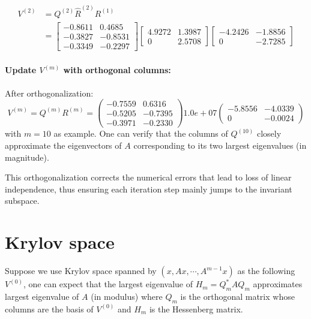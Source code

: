\documentclass[12pt]{article}
\begin{document}
$$
\begin{aligned}
    V^{(2)}& =Q^{(2)} \hat{R}^{(2)}R^{(1)}\\
            & = \begin{bmatrix}
-0.8611 & 0.4685 \\
-0.3827 & -0.8531 \\
-0.3349 & -0.2297
\end{bmatrix} \begin{bmatrix}
4.9272 & 1.3987 \\
0 & 2.5708
\end{bmatrix}\begin{bmatrix}
-4.2426 & -1.8856 \\
0 & -2.7285
\end{bmatrix}
\end{aligned}
$$

\paragraph{Update $V^{(m)}$ with orthogonal columns:} 

After orthogonalization:
$$
V^{(m)}=Q^{(m)} R^{(m)} =\begin{pmatrix}
-0.7559 & 0.6316 \\
-0.5205 & -0.7395 \\
-0.3971 & -0.2330
\end{pmatrix} 1.0e+07 \begin{pmatrix}
-5.8556 & -4.0339 \\
0 & -0.0024
\end{pmatrix}
$$
with $m = 10$ as example. One can verify that the columns of $Q^{(10)}$ closely approximate the eigenvectors of $A$ corresponding to its two largest eigenvalues (in magnitude).

This orthogonalization corrects the numerical errors that lead to loss of linear independence, thus ensuring each iteration step mainly jumps to the invariant subspace.



\section*{Krylov space}

Suppose we use Krylov space spanned by $(x, Ax, \cdots, A^{m-1}x)$ as the following $V^{(0)}$, 
one can expect that the largest eigenvalue of $H_{m}=Q_{m}^{*}AQ_{m}$ approximates largest eigenvalue of $A$ (in modulus) 
where $Q_{m}$ is the orthogonal matrix whose columns are the basis of $V^{(0)}$ and $H_{m}$ is the Hessenberg matrix.





\end{document}
